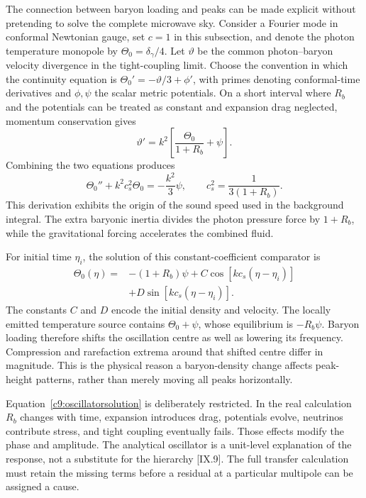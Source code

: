 The connection between baryon loading and peaks can be made explicit without pretending to solve the complete microwave sky. Consider a Fourier mode in conformal Newtonian gauge, set $c=1$ in this subsection, and denote the photon temperature monopole by $\Theta_0=\delta_\gamma/4$. Let $\vartheta$ be the common photon--baryon velocity divergence in the tight-coupling limit. Choose the convention in which the continuity equation is $\Theta_0'=-\vartheta/3+\phi'$, with primes denoting conformal-time derivatives and $\phi,\psi$ the scalar metric potentials. On a short interval where $R_b$ and the potentials can be treated as constant and expansion drag neglected, momentum conservation gives
\begin{equation}
 \vartheta'=k^2\left[\frac{\Theta_0}{1+R_b}+\psi\right].
 \label{c9:velocityosc}
\end{equation}
Combining the two equations produces
\begin{equation}
 \Theta_0''+k^2c_s^2\Theta_0=-\frac{k^2}{3}\psi,
 \qquad c_s^2=\frac{1}{3(1+R_b)}.
 \label{c9:oscillator}
\end{equation}
This derivation exhibits the origin of the sound speed used in the background integral. The extra baryonic inertia divides the photon pressure force by $1+R_b$, while the gravitational forcing accelerates the combined fluid.

For initial time $\eta_i$, the solution of this constant-coefficient comparator is
\begin{equation}
 \begin{split}
 \Theta_0(\eta)={}&-(1+R_b)\psi
 +C\cos[kc_s(\eta-\eta_i)]\\
 &+D\sin[kc_s(\eta-\eta_i)].
 \end{split}
 \label{c9:oscillatorsolution}
\end{equation}
The constants $C$ and $D$ encode the initial density and velocity. The locally emitted temperature source contains $\Theta_0+\psi$, whose equilibrium is $-R_b\psi$. Baryon loading therefore shifts the oscillation centre as well as lowering its frequency. Compression and rarefaction extrema around that shifted centre differ in magnitude. This is the physical reason a baryon-density change affects peak-height patterns, rather than merely moving all peaks horizontally.

Equation~\eqref{c9:oscillatorsolution} is deliberately restricted. In the real calculation $R_b$ changes with time, expansion introduces drag, potentials evolve, neutrinos contribute stress, and tight coupling eventually fails. Those effects modify the phase and amplitude. The analytical oscillator is a unit-level explanation of the response, not a substitute for the hierarchy [IX.9]. The full transfer calculation must retain the missing terms before a residual at a particular multipole can be assigned a cause.

